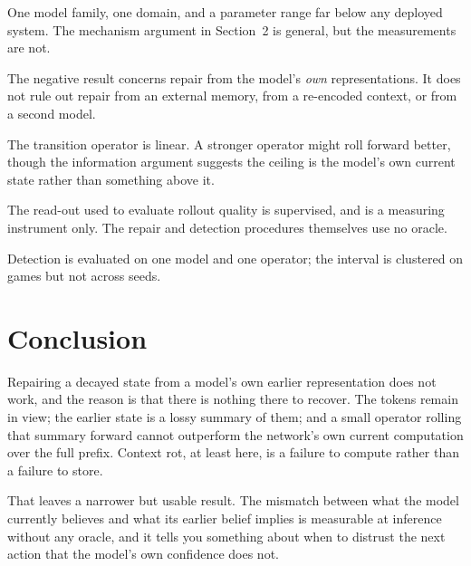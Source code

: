 \documentclass[11pt]{article}
\begin{document}
\begin{description}[nosep]
\item[L1] One model family, one domain, and a parameter range far below any
deployed system. The mechanism argument in Section~2 is general, but the
measurements are not.
\item[L2] The negative result concerns repair from the model's \emph{own}
representations. It does not rule out repair from an external memory, from a
re-encoded context, or from a second model.
\item[L3] The transition operator is linear. A stronger operator might roll
forward better, though the information argument suggests the ceiling is the
model's own current state rather than something above it.
\item[L4] The read-out used to evaluate rollout quality is supervised, and is a
measuring instrument only. The repair and detection procedures themselves use no
oracle.
\item[L5] Detection is evaluated on one model and one operator; the interval is
clustered on games but not across seeds.
\end{description}

\section{Conclusion}

Repairing a decayed state from a model's own earlier representation does not
work, and the reason is that there is nothing there to recover. The tokens remain
in view; the earlier state is a lossy summary of them; and a small operator
rolling that summary forward cannot outperform the network's own current
computation over the full prefix. Context rot, at least here, is a failure to
compute rather than a failure to store.

That leaves a narrower but usable result. The mismatch between what the model
currently believes and what its earlier belief implies is measurable at inference
without any oracle, and it tells you something about when to distrust the next
action that the model's own confidence does not.



\end{document}
